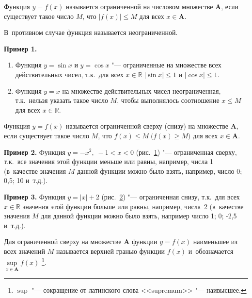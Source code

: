 \begin{Def}
Функция $y = f(x)$ называется ограниченной на числовом множестве $\mathbf{A}$,
если существует такое число $M$, что $|f(x)| \leqslant M$
для всех $x \in \mathbf{A}$.

В~противном случае функция называется неограниченной.
\end{Def}

\textbf{Пример 1.}
\begin{enumerate}
\item Функция $y = \sin x$ и $y = \cos x$ "--- ограниченные на множестве
всех действительных чисел, т.к.\ для всех
$x \in \mathbb{R} \; |\sin x| \leqslant 1$ и $|\cos x| \leqslant 1$.

\item Функция $y = x$ на множестве действительных чисел неограниченная,
т.к.\ нельзя указать такое число $M$, чтобы выполнялось соотношение
$x \leqslant M$ для всех $x \in \mathbb{R}$.
\end{enumerate}

\begin{Def}
Функция $y = f(x)$ называется ограниченной сверху (снизу) на множестве
$\mathbf{A}$, если существует такое число $M$, что
\linebreak ${f(x) \leqslant M \; \bigl( f(x) \geqslant M \bigr)}$
для всех $x \in \mathbf{A}$.
\end{Def}

\textbf{Пример 2.}
Функция $y = -x^{2}, \; -1 < x < 0$ (рис.\ \ref{fig_1_5_10}) "--- ограниченная сверху,
т.к.\ все значения этой функции меньше или равны, например, числа 1
(в~качестве значения $M$ данной функции можно было взять, например,
число 0; 0{,}5; 10 и~т.д.).

\begin{figure}\label{fig_1_5_10}
\end{figure}

\textbf{Пример 3.}
Функция $y = |x| + 2$ (рис.\ \ref{fig_1_5_11}) "--- ограниченная снизу,
т.к.\ для всех $x \in \mathbb{R}$ значения этой функции больше или равны,
например, числа~2 (в~качестве значения $M$ для данной функции можно было
взять, например число 1; 0; -2{,}5 и~т.д.).

\begin{figure}\label{fig_1_5_11}
\end{figure}

Для ограниченной сверху на множестве $\mathbf{A}$ функции $y = f(x)$
наименьшее из всех значений $M$ называется верхней гранью функции $f(x)$
и~обозначается $\sup\limits_{x \in \mathbf{A}} f(x)$
\footnote{$\sup$ "--- сокращение от латинского слова <<supremum>>
"--- наивысшее.}.

